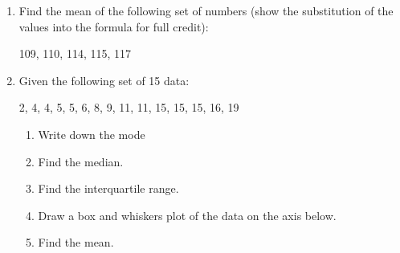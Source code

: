 \documentclass[12pt, twoside]{article}
\begin{document}
\begin{enumerate}
\item Find the mean of the following set of numbers (show the substitution of the values into the formula for full credit):
  \begin{center}
    109, 110, 114, 115, 117
  \end{center}

\newpage
\item Given the following set of 15 data:
    \begin{center}
    2, 4, 4, 5, 5, 6, 8, 9, 11, 11, 15, 15, 15, 16, 19
  \end{center}
  \begin{enumerate}
    \item Write down the mode \vspace{1cm}
    \item Find the median. \vspace{1.5cm}
    \item Find the interquartile range. \vspace{1cm}
    \item Draw a box and whiskers plot of the data on the axis below. \vspace{1cm}
      \begin{center}
      \end{center} \vspace{0.2cm}
      \item Find the mean.
    \end{enumerate} \vspace{1cm}


\end{enumerate}
\end{document}
